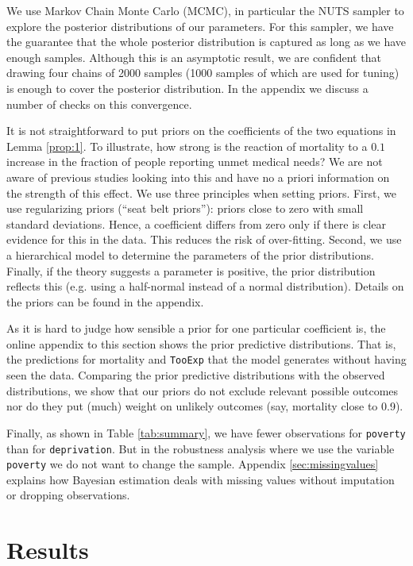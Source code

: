 \documentclass[a4paper,12pt]{article}
\begin{document}
We use Markov Chain Monte Carlo (MCMC), in particular the NUTS sampler to explore the posterior distributions of our parameters. For this sampler, we have the guarantee that the whole posterior distribution is captured as long as we have enough samples. Although this is an asymptotic result, we are confident that drawing four chains of 2000 samples (1000 samples of which are used for tuning) is enough to cover the posterior distribution. In the appendix we discuss a number of checks on this convergence.

It is not straightforward to put priors on the coefficients of the two equations in Lemma \ref{prop:1}. To illustrate, how strong is the reaction of mortality to a \(0.1\) increase in the fraction of people reporting unmet medical needs? We are not aware of previous studies looking into this and have no a priori information on the strength of this effect. We use three principles when setting priors. First, we use regularizing priors (``seat belt priors''): priors close to zero with small standard deviations. Hence, a coefficient differs from zero only if there is clear evidence for this in the data. This reduces the risk of over-fitting. Second, we use a hierarchical model to determine the parameters of the prior distributions. Finally, if the theory suggests a parameter is positive, the prior distribution reflects this (e.g. using a half-normal instead of a normal distribution). Details on the priors can be found in the appendix.

As it is hard to judge how sensible a prior for one particular coefficient is, the online appendix to this section shows the prior predictive distributions. That is, the predictions for mortality and \texttt{TooExp} that the model generates without having seen the data. Comparing the prior predictive distributions with the observed distributions, we show that our priors do not exclude relevant possible outcomes nor do they put (much) weight on unlikely outcomes (say, mortality close to 0.9).

Finally, as shown in Table \ref{tab:summary}, we have fewer observations for \texttt{poverty} than for \texttt{deprivation}. But in the robustness analysis where we use the variable \texttt{poverty} we do not want to change the sample. Appendix \ref{sec:missingvalues} explains how Bayesian estimation deals with missing values without imputation or dropping observations.

\section{Results}
\label{sec:orga6e259b}
\end{document}
